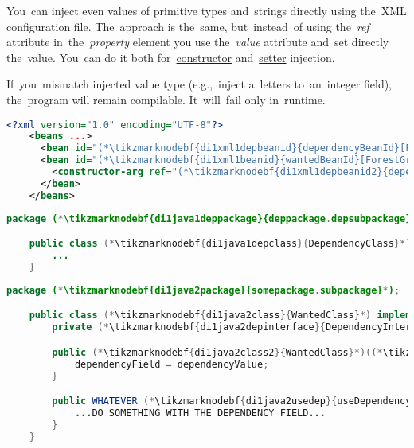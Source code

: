 \enlargethispage{10mm}
\label{injectingliteralvalues}
You~can inject even values of primitive types and~strings directly using the~XML configuration file. The~approach is the~same, but~instead~of using the~\textit{ref} attribute in~the~\textit{property} element you use the~\textit{value} attribute and~set directly the~value. You~can do it both for~\hyperref[constructorinjection]{constructor} and~\hyperref[setterinjection]{setter} injection.

\warning If~you~mismatch injected value type (e.g.,~inject a~letters to~an~integer field), the~program will remain compilable. It~will~fail only in~runtime.
\newpage

\begin{lstlisting}[language=XML, title={Configuration XML}]
    <?xml version="1.0" encoding="UTF-8"?>
    <beans ...>
      <bean id="(*\tikzmarknodebf{di1xml1depbeanid}{dependencyBeanId}[ForestGreen]*)" class="(*\tikzmarknodebf{di1xml1deppackage}{deppackage.depsubpackage}[ForestGreen]*).(*\tikzmarknodebf{di1xml1depclass}{DependencyClass}[ForestGreen]*)"/>
      <bean id="(*\tikzmarknodebf{di1xml1beanid}{wantedBeanId}[ForestGreen]*)" class="(*\tikzmarknodebf{di1xml1package}{somepackage.subpackage}[ForestGreen]*).(*\tikzmarknodebf{di1xml1class}{WantedClass}[ForestGreen]*)">
        <constructor-arg ref="(*\tikzmarknodebf{di1xml1depbeanid2}{dependencyBeanId}[ForestGreen]*)"/>
      </bean>
    </beans>
\end{lstlisting}
\begin{lstlisting}[language=Java, title={Dependency class}]
    package (*\tikzmarknodebf{di1java1deppackage}{deppackage.depsubpackage}*);

    public class (*\tikzmarknodebf{di1java1depclass}{DependencyClass}*) implements (*\tikzmarknodebf{di1java1depinterface}{DependencyInterface}*) {
        ...
    }
\end{lstlisting}
\begin{lstlisting}[language=Java, title={Wanted class with the constructor}]
    package (*\tikzmarknodebf{di1java2package}{somepackage.subpackage}*);

    public class (*\tikzmarknodebf{di1java2class}{WantedClass}*) implements (*\tikzmarknodebf{di1java2interface}{WantedClassInterface}*) {
        private (*\tikzmarknodebf{di1java2depinterface}{DependencyInterface}*) dependencyField;

        public (*\tikzmarknodebf{di1java2class2}{WantedClass}*)((*\tikzmarknodebf{di1java2depinterface2}{DependencyInterface}*) dependencyValue) {
            dependencyField = dependencyValue;
        }

        public WHATEVER (*\tikzmarknodebf{di1java2usedep}{useDependency}*)() {
            ...DO SOMETHING WITH THE DEPENDENCY FIELD...
        }
    }
\end{lstlisting}
